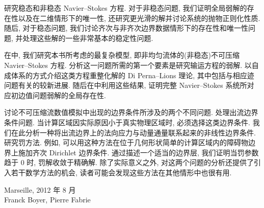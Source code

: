 研究稳态和非稳态 Navier--Stokes 方程. 对于非稳态问题, 我们证明全局弱解的存在性以及在二维情形下的唯一性, 还研究更光滑的解并讨论系统的抛物正则化性质. 随后, 对于稳态问题, 我们讨论齐次与非齐次边界数据情形下的存在性和唯一性问题, 并处理这些解的一些非常基本的稳定性问题.

在中, 我们研究本书所考虑的最复杂模型, 即非均匀流体的(非稳态)不可压缩 Navier--Stokes 方程. 分析这一问题所需的第一个要素是研究输运方程的弱解. 以自成体系的方式介绍这类方程重整化解的 Di Perna--Lions 理论, 其中包括与相应迹问题有关的较新进展. 随后在中利用这些结果, 证明完整 Navier--Stokes 系统所对应初边值问题弱解的全局存在性.

讨论不可压缩流数值模拟中出现的边界条件所涉及的两个不同问题. 处理出流边界条件问题. 当计算区域因实际原因小于真实物理区域时, 必须选择这类边界条件. 我们在此分析一种将出流边界上的法向应力与动量通量联系起来的非线性边界条件. 研究罚方法. 例如, 可以用这种方法在位于几何形状简单的计算区域内的障碍物边界上施加齐次 Dirichlet 边界条件. 通过描述一个适当的边界层, 我们证明当罚参数趋于 $0$ 时, 罚解收敛于精确解. 除了实际意义之外, 对这两个问题的分析还提供了引入若干数学方法的机会, 读者可能会发现这些方法在其他情形中也很有用.

\begin{flushright}
Marseille, 2012 年 8 月\\
Franck Boyer, Pierre Fabrie
\end{flushright}
